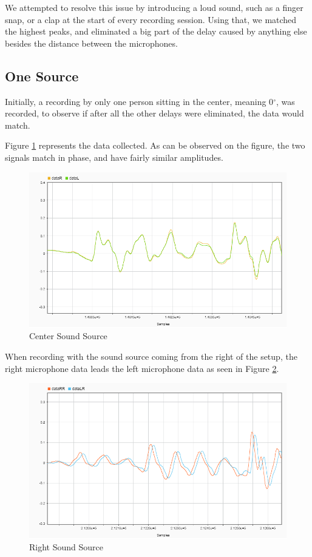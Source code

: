 We attempted to resolve this issue by introducing a loud sound, such as a finger snap, or a clap at the 
start of every recording session. Using that, we matched the highest peaks, and eliminated a big part
of the delay caused by anything else besides the distance between the microphones.

\subsection{One Source}
Initially, a recording by only one person sitting in the center, meaning 0$^\circ$, was recorded, to observe
if after all the other delays were eliminated, the data would match.

Figure \ref{fig:C} represents the data collected. As can be observed on the figure, the two signals match in
phase, and have fairly similar amplitudes.
\begin{figure}[htp]
  \centering
  \includegraphics[width=0.8\linewidth]{Illustrations/DataC.png}
  \caption{Center Sound Source}
  \label{fig:C}
\end{figure}

\newpage

When recording with the sound source coming from the right of the setup, the right microphone data leads
the left microphone data as seen in Figure \ref{fig:R}.

\begin{figure}[htp]
  \centering
  \includegraphics[width=0.8\linewidth]{Illustrations/DataR.png}
  \caption{Right Sound Source}
  \label{fig:R}
\end{figure}

